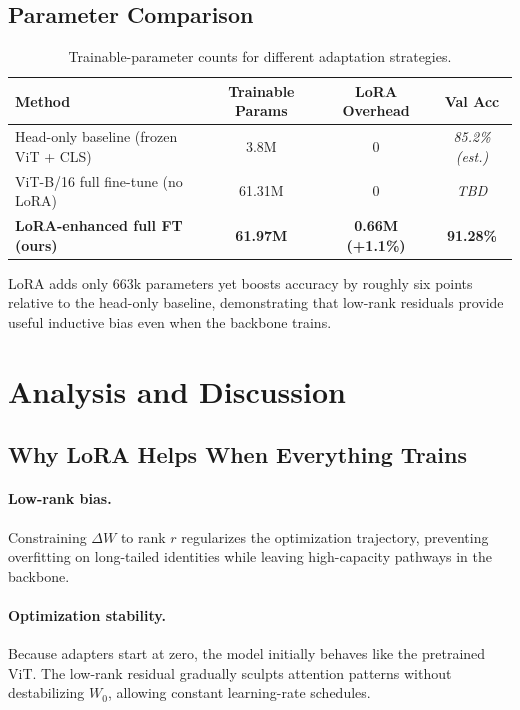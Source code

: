 \documentclass[11pt]{article}
\begin{document}
\subsection{Parameter Comparison}

\begin{table}[H]
\centering
\small
\begin{tabular}{lccc}
\toprule
\textbf{Method} & \textbf{Trainable Params} & \textbf{LoRA Overhead} & \textbf{Val Acc} \\
\midrule
Head-only baseline (frozen ViT + CLS) & 3.8M & 0 & \textit{85.2\% (est.)} \\
ViT-B/16 full fine-tune (no LoRA) & 61.31M & 0 & \textit{TBD} \\
\textbf{LoRA-enhanced full FT (ours)} & \textbf{61.97M} & \textbf{0.66M (+1.1\%)} & \textbf{91.28\%} \\
\bottomrule
\end{tabular}
\caption{Trainable-parameter counts for different adaptation strategies.}
\label{tab:params}
\end{table}

LoRA adds only 663k parameters yet boosts accuracy by roughly six points relative to the head-only baseline, demonstrating that low-rank residuals provide useful inductive bias even when the backbone trains.

\section{Analysis and Discussion}

\subsection{Why LoRA Helps When Everything Trains}

\paragraph{Low-rank bias.} Constraining $\Delta W$ to rank $r$ regularizes the optimization trajectory, preventing overfitting on long-tailed identities while leaving high-capacity pathways in the backbone.

\paragraph{Optimization stability.} Because adapters start at zero, the model initially behaves like the pretrained ViT. The low-rank residual gradually sculpts attention patterns without destabilizing $W_0$, allowing constant learning-rate schedules.
\end{document}
